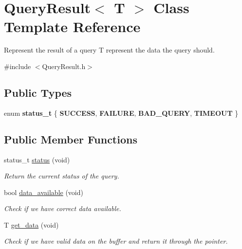 \hypertarget{classQueryResult}{\section{Query\+Result$<$ T $>$ Class Template Reference}
\label{classQueryResult}
}


Represent the result of a query  T represent the data the query should.  




{\ttfamily \#include $<$Query\+Result.\+h$>$}

\subsection*{Public Types}
\begin{DoxyCompactItemize}
\item 
\hypertarget{classQueryResult_aa0d5aa6225fcb1bd073c07041a677209}{enum {\bfseries status\+\_\+t} \{ {\bfseries S\+U\+C\+C\+E\+S\+S}, 
{\bfseries F\+A\+I\+L\+U\+R\+E}, 
{\bfseries B\+A\+D\+\_\+\+Q\+U\+E\+R\+Y}, 
{\bfseries T\+I\+M\+E\+O\+U\+T}
 \}}\label{classQueryResult_aa0d5aa6225fcb1bd073c07041a677209}

\end{DoxyCompactItemize}
\subsection*{Public Member Functions}
\begin{DoxyCompactItemize}
\item 
status\+\_\+t \hyperlink{classQueryResult_ab4b6fc200ad1553dbcfe447fb0e0acda}{status} (void)
\begin{DoxyCompactList}\small\item\em Return the current status of the query. \end{DoxyCompactList}\item 
bool \hyperlink{classQueryResult_a7cd9fa97e7267b1a901a3b5c694612c0}{data\+\_\+available} (void)
\begin{DoxyCompactList}\small\item\em Check if we have correct data available. \end{DoxyCompactList}\item 
T \hyperlink{classQueryResult_a0725b099b0323f6ffc711bd77b9e21b7}{get\+\_\+data} (void)
\begin{DoxyCompactList}\small\item\em Check if we have valid data on the buffer and return it through the pointer. \end{DoxyCompactList}\end{DoxyCompactItemize}


